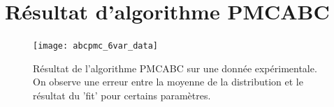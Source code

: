 \documentclass[a4paper,fleqn,leqno]{article}
\begin{document}
\section{Résultat d'algorithme PMCABC}\label{appendix:B}

\begin{figure}[H]
\centering
\texttt{[image: abcpmc\_6var\_data]}
\caption{Résultat de l'algorithme PMCABC sur une donnée expérimentale. On observe une erreur entre la moyenne de la distribution et le résultat du 'fit' pour certains paramètres.}
\end{figure}

\newpage



\end{document}
